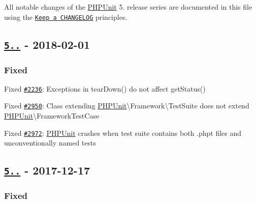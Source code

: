 All notable changes of the \mbox{\hyperlink{namespace_p_h_p_unit}{P\+H\+P\+Unit}} 5. release series are documented in this file using the \href{http://keepachangelog.com/}{\tt Keep a C\+H\+A\+N\+G\+E\+L\+OG} principles.

\subsection*{\href{https://github.com/sebastianbergmann/phpunit/compare/5.7.26...5.7.27}{\tt 5..} -\/ 2018-\/02-\/01}

\subsubsection*{Fixed}


\begin{DoxyItemize}
\item Fixed \href{https://github.com/sebastianbergmann/phpunit/issues/2236}{\tt \#2236}\+: Exceptions in {\ttfamily tear\+Down()} do not affect {\ttfamily get\+Status()}
\item Fixed \href{https://github.com/sebastianbergmann/phpunit/issues/2950}{\tt \#2950}\+: Class extending {\ttfamily \mbox{\hyperlink{namespace_p_h_p_unit}{P\+H\+P\+Unit}}\textbackslash{}Framework\textbackslash{}Test\+Suite} does not extend {\ttfamily \mbox{\hyperlink{namespace_p_h_p_unit}{P\+H\+P\+Unit}}\textbackslash{}Framework\+Test\+Case}
\item Fixed \href{https://github.com/sebastianbergmann/phpunit/issues/2972}{\tt \#2972}\+: \mbox{\hyperlink{namespace_p_h_p_unit}{P\+H\+P\+Unit}} crashes when test suite contains both {\ttfamily .phpt} files and unconventionally named tests
\end{DoxyItemize}

\subsection*{\href{https://github.com/sebastianbergmann/phpunit/compare/5.7.25...5.7.26}{\tt 5..} -\/ 2017-\/12-\/17}

\subsubsection*{Fixed}


